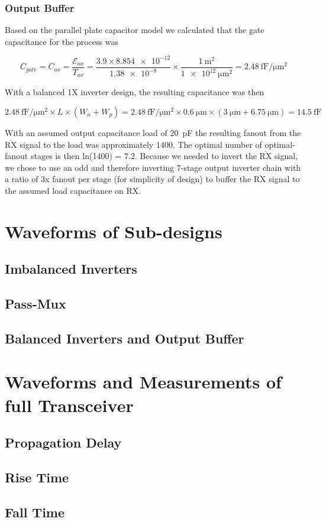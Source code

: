 \documentclass[12pt, letterpaper]{article}
\newcommand{\micron}{\micro\meter}
\newcommand{\RXp}{$\overline{\mbox{RX}}$ } %
\begin{document}
\subsubsection{Output Buffer}
Based on the parallel plate capacitor model we calculated that the gate capacitance for the process was

\[
C_{gate} = C_{ox} = \frac{\mathcal{E}_{ox}}{T_{ox}} =
\frac{3.9 \times \num{8.854e-12}}{\num{1.38e-8}} \times
\frac{\SI{1}{\meter\squared}}{\SI{1e12}{\micron\squared}} =
\SI{2.48}{\femto\farad\per\micron\squared}
\]

With a balanced 1X inverter design, the resulting capacitance was then

\[
\SI{2.48}{\femto\farad\per\micron\squared} \times L \times (W_n + W_p) =
\SI{2.48}{\femto\farad\per\micron\squared} \times \SI{0.6}{\micron} \times (\SI{3}{\micron} + \SI{6.75}{\micron}) =
\SI{14.5}{\femto\farad}
\]

With an assumed output capacitance load of \SI{20}{\pico\farad} the resulting fanout from the \RXp signal to the load was approximately 1400.
The optimal number of optimal-fanout stages is then ln(1400) = 7.2.
Because we needed to invert the \RXp signal, we chose to use an odd and therefore inverting 7-stage output inverter chain with a ratio of 3x fanout per stage (for simplicity of design) to buffer the \RXp signal to the assumed load capacitance on RX.

\section{Waveforms of Sub-designs}
\subsection{Imbalanced Inverters}
\subsection{Pass-Mux}
\subsection{Balanced Inverters and Output Buffer}

\section{Waveforms and Measurements of full Transceiver}
\subsection{Propagation Delay}
\subsection{Rise Time}
\subsection{Fall Time}
\end{document}
